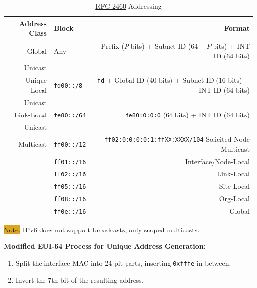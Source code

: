 \documentclass[12pt]{article}
\newcommand{\note}[1]{\colorbox{#1}{Note:}}
\newcommand{\RFC}[1]{\href{https://datatracker.ietf.org/doc/html/rfc#1}{RFC #1}}
\begin{document}
	\begin{table}[H]
	\centering
	\caption{\RFC{2460} Addressing \label{tab:ADDRESSING IPV6}}
	\begin{tabular}{rlr}
	\hline
	\textbf{Address Class}	& \textbf{Block}		& \textbf{Format}\\\hline
	Global 			& Any			& Prefix ($P$ bits) + Subnet ID ($64-P$ bits) + INT ID (64 bits)\\
	Unicast			&				&\\\hline
	Unique Local 		& \texttt{fd00::/8}		& \texttt{fd} + Global ID (40 bits) + Subnet ID (16 bits) + INT ID (64 bits)\\
	Unicast			&				&\\\hline
	Link-Local 			& \texttt{fe80::/64}	& \texttt{fe80:0:0:0} (64 bits) + INT ID (64 bits)\\
	Unicast			&				&\\\hline
	Multicast			& \texttt{ff00::/12}	& \texttt{ff02:0:0:0:0:1:ffXX:XXXX/104} Solicited-Node Multicast\\
					& \texttt{ff01::/16}	& Interface/Node-Local\\
					& \texttt{ff02::/16}	& Link-Local\\
					& \texttt{ff05::/16}	& Site-Local\\
					& \texttt{ff08::/16}	& Org-Local\\
					& \texttt{ff0e::/16}	& Global\\\hline
	\end{tabular}\end{table}
	\note{Goldenrod} IPv6 does not support broadcasts, only scoped multicasts.

	\textbf{Modified EUI-64 Process for Unique Address Generation:}
	\begin{enumerate} \itemsep -5pt
		\label{itm:EUI64}
		\item{Split the interface MAC into 24-pit parts, inserting \texttt{0xfffe} in-between.}
		\item{Invert the 7th bit of the resulting address.}
	\end{enumerate}

\end{document}
